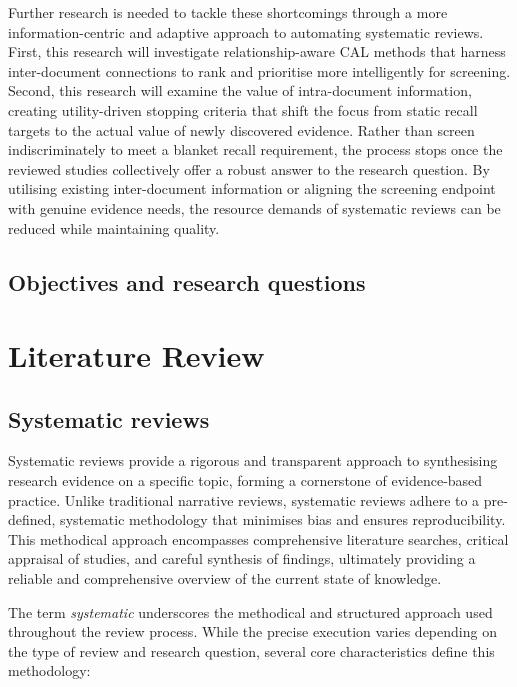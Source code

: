 \documentclass[10pt,oneside]{book}
\begin{document}
Further research is needed to tackle these shortcomings through a more information-centric and adaptive approach to automating systematic reviews. First, this research will investigate relationship-aware CAL methods that harness inter-document connections to rank and prioritise more intelligently for screening. Second, this research will examine the value of intra-document information, creating utility-driven stopping criteria that shift the focus from static recall targets to the actual value of newly discovered evidence. Rather than screen indiscriminately to meet a blanket recall requirement, the process stops once the reviewed studies collectively offer a robust answer to the research question. By utilising existing inter-document information or aligning the screening endpoint with genuine evidence needs, the resource demands of systematic reviews can be reduced while maintaining quality.

\section{Objectives and research questions}

\newpage
\chapter{Literature Review}

\section{Systematic reviews}

Systematic reviews provide a rigorous and transparent approach to synthesising research evidence on a specific topic, forming a cornerstone of evidence-based practice. Unlike traditional narrative reviews, systematic reviews adhere to a pre-defined, systematic methodology that minimises bias and ensures reproducibility. This methodical approach encompasses comprehensive literature searches, critical appraisal of studies, and careful synthesis of findings, ultimately providing a reliable and comprehensive overview of the current state of knowledge.

The term \emph{systematic} underscores the methodical and structured approach used throughout the review process. While the precise execution varies depending on the type of review and research question, several core characteristics define this methodology:
\end{document}
